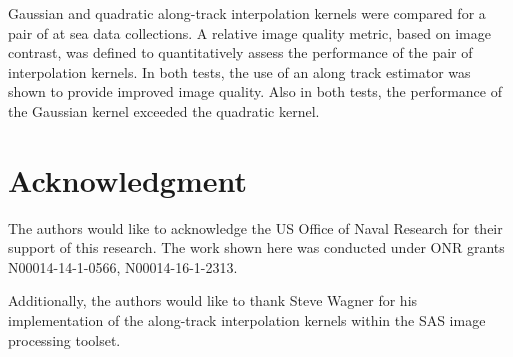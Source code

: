 \documentclass[conference]{IEEEtran}
\begin{document}
Gaussian and quadratic along-track interpolation kernels were compared for a pair of at sea data collections. A relative image quality metric, based on image contrast, was defined to quantitatively assess the performance of the pair of interpolation kernels. In both tests, the use of an along track estimator was shown to provide improved image quality. Also in both tests, the performance of the Gaussian kernel exceeded the quadratic kernel.



\section*{Acknowledgment}
The authors would like to acknowledge the US Office of Naval Research for their support of this research. The work shown here was conducted under ONR grants N00014-14-1-0566, N00014-16-1-2313.

Additionally, the authors would like to thank Steve Wagner for his implementation of the along-track interpolation kernels within the SAS image processing toolset.






%
%
%




\end{document}
